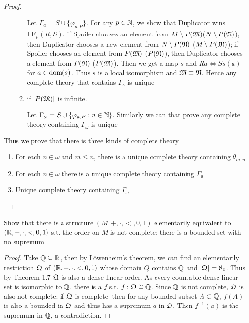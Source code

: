 \documentclass[11pt]{article}
\def \EF {\text{EF}}
\begin{document}
\begin{proof}
\begin{enumerate}
\begin{enumerate}
Let \(\Gamma_a=S\cup\{\varphi_{a,P}\}\). For any \(p\in\mathbb{N}\), we show that Duplicator wins \(\EF_p(R,S)\): if
Spoiler chooses an element from \(M\setminus P(\mathfrak{M})\)(\(N\setminus P(\mathfrak{N})\)), then Duplicator chooses a new element
from \(N\setminus P(\mathfrak{N})\) (\(M\setminus P(\mathfrak{M})\)); if Spoiler chooses an element from \(P(\mathfrak{M})\) (\(P(\mathfrak{N})\)), then
Duplicator chooses a element from \(P(\mathfrak{N})\) (\(P(\mathfrak{M})\)). Then we get a map \(s\)
and \(Ra\Leftrightarrow Ss(a)\) for \(a\in\operatorname{dom}(s)\). Thus \(s\) is a local isomorphism and \(\mathfrak{M}\equiv\mathfrak{N}\). Hence any
complete theory that contains \(\Gamma_a\) is unique
\item if \(\abs{P(\fM)}\) is infinite.

Let \(\Gamma_\omega=S\cup\{\varphi_{n,P}:n\in\mathbb{N}\}\). Similarly we can that prove any complete theory containing \(\Gamma_\omega\) is
unique
\end{enumerate}
\end{enumerate}


Thus we prove that there is three kinds of complete theory
\begin{enumerate}
\item For each \(n\in\omega\) and \(m\le n\), there is a unique complete theory containing \(\theta_{m,n}\)
\item For each \(n\in\omega\) there is a unique complete theory containing \(\Gamma_n\)
\item Unique complete theory containing \(\Gamma_\omega\)
\end{enumerate}
\end{proof}

\begin{exercise}
Show that there is a structure \((M,+,\cdot,<,0,1)\) elementarily equivalent to \((\mathbb{R},+,\cdot,<,0,1)\) s.t.
the order on \(M\) is not complete: there is a bounded set with no supremum
\end{exercise}

\begin{proof}
Take \(\mathbb{Q}\subseteq\mathbb{R}\), then by Löwenheim's theorem, we can find an elementarily restriction \(\mathfrak{Q}\)
of \((\mathbb{R},+,\cdot,<,0,1)\) whose domain \(Q\) contains \(\mathbb{Q}\) and \(\abs{\fQ}=\aleph_0\). Thus by Theorem 1.7 \(\mathfrak{Q}\) is
also a dense linear order. As every countable dense linear set is isomorphic to \(\mathbb{Q}\), there is
a \(f\) s.t. \(f:\mathfrak{Q}\cong\mathbb{Q}\).
Since \(\mathbb{Q}\) is not complete, \(\mathfrak{Q}\) is also not complete: if \(\mathfrak{Q}\) is complete, then for any bounded
subset \(A\subset\mathbb{Q}\), \(f(A)\) is also a bounded in \(\mathfrak{Q}\) and thus has a supremum \(a\) in \(\mathfrak{Q}\).
Then \(f^{-1}(a)\) is the supremum in \(\mathbb{Q}\), a contradiction.
\end{proof}
\end{document}
